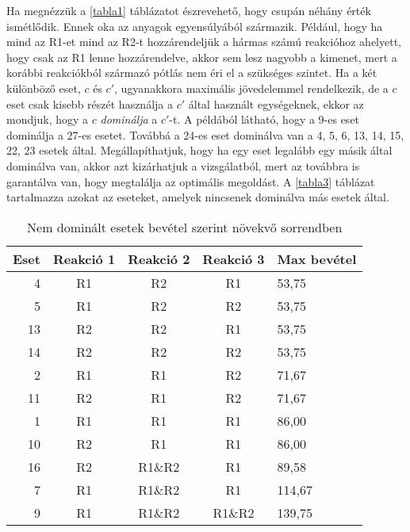 Ha megnézzük a \ref{tabla1} táblázatot észrevehető, hogy csupán néhány érték ismétlődik. Ennek oka az anyagok egyensúlyából származik. Például, hogy ha mind az R1-et mind az R2-t hozzárendeljük a hármas számú reakcióhoz ahelyett, hogy csak az R1 lenne hozzárendelve, akkor sem lesz nagyobb a kimenet, mert a korábbi reakciókból származó pótlás nem éri el a szükséges szintet. Ha a két különböző eset, $c$ és $c'$, ugyanakkora maximális jövedelemmel rendelkezik, de a $c$ eset csak kisebb részét használja a $c'$ által használt egységeknek, ekkor az mondjuk, hogy a $c$ \textit{dominálja} a $c'$-t. A példából látható, hogy a 9-es eset dominálja a 27-es esetet. Továbbá a 24-es eset dominálva van a 4, 5, 6, 13, 14, 15, 22, 23 esetek által. Megállapíthatjuk, hogy ha egy eset legalább egy másik által dominálva van, akkor azt kizárhatjuk a vizsgálatból, mert az továbbra is garantálva van, hogy megtalálja az optimális megoldást. A \ref{tabla3} táblázat tartalmazza azokat az eseteket, amelyek nincsenek dominálva más esetek által. 	

\begin{table}[H]
	\begin{center}
		\caption{Nem dominált esetek bevétel szerint növekvő sorrendben}
		\captionsetup[table]{skip=10pt}	
		\label{tabla2}	
		\begin{tabular}{r|ccc|l}
		Eset & Reakció 1 & Reakció 2 & Reakció 3 & Max bevétel  \\ 
		\hline
		4    & R1        & R2        & R1        & 53,75        \\
		5    & R1        & R2        & R2        & 53,75        \\
		13   & R2        & R2        & R1        & 53,75        \\
		14   & R2        & R2        & R2        & 53,75        \\
		2    & R1        & R1        & R2        & 71,67        \\
		11   & R2        & R1        & R2        & 71,67        \\
		1    & R1        & R1        & R1        & 86,00        \\
		10   & R2        & R1        & R1        & 86,00        \\
		16   & R2        & R1\&R2    & R1        & 89,58        \\
		7    & R1        & R1\&R2    & R1        & 114,67       \\
		9    & R1        & R1\&R2    & R1\&R2    & 139,75      
		\end{tabular}
	\end{center}
\end{table}

